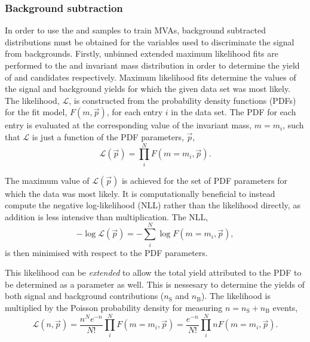 \subsubsection{Background subtraction}
\label{sec:MVAbackgroundsubtraction}
In order to use the \decay{\Bs}{\jpsi\phiz} and \decay{\Bsb}{\Dsp\pim} samples to train MVAs, background subtracted distributions must be obtained for the variables used to discriminate the signal from backgrounds.  Firstly, unbinned extended maximum likelihood fits are performed to the \Dsp and \phiz invariant mass distribution in order to determine the yield of \Dsp and \phiz candidates respectively. 
Maximum likelihood fits determine the values of the signal and background yields for which the given data set was most likely. The likelihood, $\mathcal{L}$, is constructed from the probability density functions (PDFs) for the fit model, $F(m,\vec{p})$, for each entry $i$ in the data set. The PDF for each entry is evaluated at the corresponding value of the invariant mass, $m = m_{i}$, such that $\mathcal{L}$ is just a function of the PDF parameters, $\vec{p}$,
\begin{equation}
\mathcal{L}(\vec{p}) = \prod_{i}^{N} F(m=m_{i},\vec{p}).
\end{equation}

The maximum value of $\mathcal{L}(\vec{p})$ is achieved for the set of PDF parameters for which the data was most likely. 
It is computationally beneficial to instead compute the negative log-likelihood (NLL) rather than the likelihood directly, as addition is less intensive than multiplication. The NLL,
\begin{equation}
-\log\mathcal{L}(\vec{p}) = -\sum_{i}^{N} \log F(m=m_{i},\vec{p}),
\end{equation}
is then minimised with respect to the PDF parameters.

This likelihood can be \emph{extended} to allow the total yield attributed to the PDF to be determined as a parameter as well. This is nessesary to determine the yields of both signal and background contributions ($n_{\text{S}}$ and $n_{\text{B}}$).
The likelihood is multiplied by the Poisson probability density for measuring $n = n_{\text{S}} + n_{\text{B}}$ events, 
\begin{equation}
\mathcal{L}(n,\vec{p}) = \frac{n^{N}e^{-n}}{N!}\prod_{i}^{N} F(m=m_{i},\vec{p}) = \frac{e^{-n}}{N!}\prod_{i}^{N} n F(m=m_{i},\vec{p}).
\end{equation}

